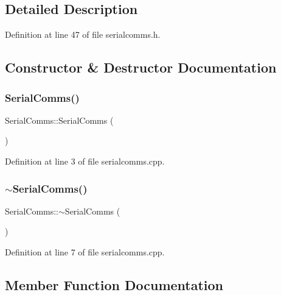 \subsection{Detailed Description}


Definition at line 47 of file serialcomms.\+h.



\subsection{Constructor \& Destructor Documentation}
\mbox{\label{class_serial_comms_a0a40e994d9726ef0df2e109942c24017}} 
\subsubsection{\texorpdfstring{SerialComms()}{SerialComms()}}
{\footnotesize\ttfamily Serial\+Comms\+::\+Serial\+Comms (\begin{DoxyParamCaption}{ }\end{DoxyParamCaption})}



Definition at line 3 of file serialcomms.\+cpp.

\mbox{\label{class_serial_comms_a895edf0d156be20f30422969ee30b20f}} 
\subsubsection{\texorpdfstring{$\sim$SerialComms()}{~SerialComms()}}
{\footnotesize\ttfamily Serial\+Comms\+::$\sim$\+Serial\+Comms (\begin{DoxyParamCaption}{ }\end{DoxyParamCaption})}



Definition at line 7 of file serialcomms.\+cpp.



\subsection{Member Function Documentation}
\mbox{\label{class_serial_comms_a4488e53e2a6693ad72759eff9862ac37}} 
